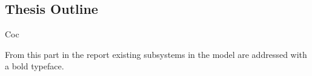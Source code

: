 \subsection{Thesis Outline}

Coc

From this part in the report existing subsystems in the model are addressed with a bold typeface.
